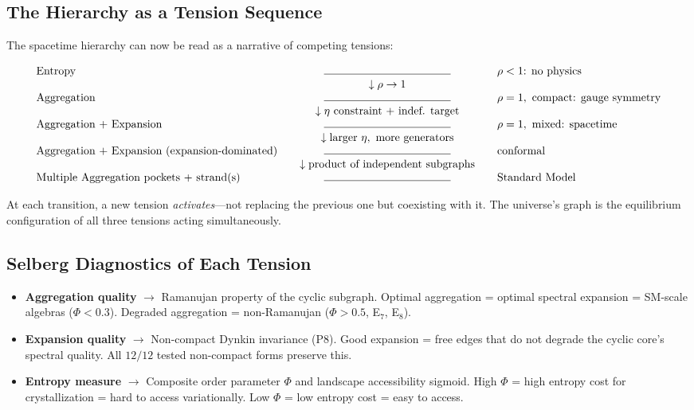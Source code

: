 \subsection{The Hierarchy as a Tension Sequence}\label{sec:tension_sequence}

The spacetime hierarchy can now be read as a narrative of competing tensions:

{\tiny
\begin{equation}
\begin{array}{lcl}
\text{Entropy} \quad & \rule{4cm}{0.4pt} & \quad \ro < 1\text{: no physics} \\
\quad & \downarrow \ro \to 1 & \quad \\
\text{Aggregation} \quad & \rule{4cm}{0.4pt} & \quad \ro = 1, \text{ compact: gauge symmetry} \\
\quad & \downarrow \et \text{ constraint + indef. target} & \quad \\
\text{Aggregation + Expansion} \quad & \rule{4cm}{0.4pt} & \quad \ro = 1, \text{ mixed: spacetime} \\
\quad & \downarrow \text{larger } \et, \text{ more generators} & \quad \\
\text{Aggregation + Expansion (expansion-dominated)} \quad & \rule{4cm}{0.4pt} & \quad \text{conformal} \\
\quad & \downarrow \text{product of independent subgraphs} & \quad \\
\text{Multiple Aggregation pockets + strand(s)} \quad & \rule{4cm}{0.4pt} & \quad \text{Standard Model}
\end{array}
\end{equation}
}

At each transition, a new tension \emph{activates}---not replacing the previous one but coexisting with it. The universe's graph is the equilibrium configuration of all three tensions acting simultaneously.

\subsection{Selberg Diagnostics of Each Tension}\label{sec:tension_diagnostics}

\begin{itemize}
    \item \textbf{Aggregation quality} $\to$ Ramanujan property of the cyclic subgraph. Optimal aggregation = optimal spectral expansion = SM-scale algebras ($\Phi < 0.3$). Degraded aggregation = non-Ramanujan ($\Phi > 0.5$, E$_7$, E$_8$).
    
    \item \textbf{Expansion quality} $\to$ Non-compact Dynkin invariance (P8). Good expansion = free edges that do not degrade the cyclic core's spectral quality. All $12/12$ tested non-compact forms preserve this.
    
    \item \textbf{Entropy measure} $\to$ Composite order parameter $\Phi$ and landscape accessibility sigmoid. High $\Phi$ = high entropy cost for crystallization = hard to access variationally. Low $\Phi$ = low entropy cost = easy to access.
\end{itemize}


